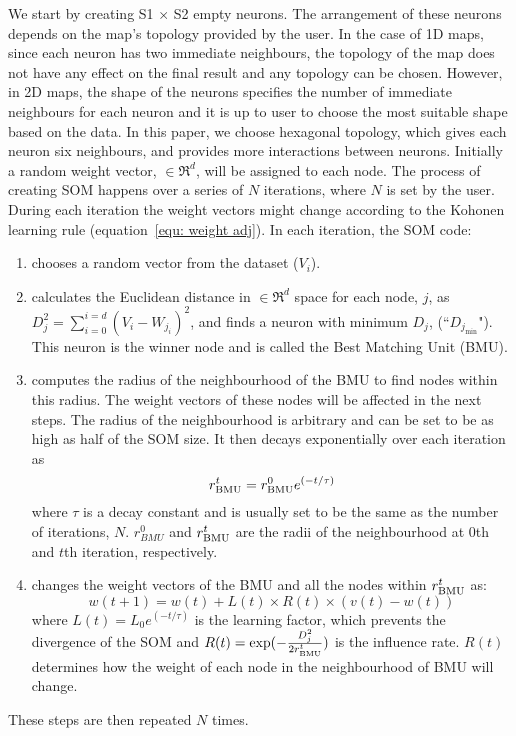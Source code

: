      We start by creating S1 $\times$ S2 empty neurons. 
     The arrangement of these neurons depends on the map's topology provided by the user. 
     In the case of 1D maps, since each neuron has two immediate neighbours, the topology of the map does not have any effect on the final result and any topology can be chosen.
     However, in 2D maps, the shape of the neurons specifies the number of immediate neighbours for each neuron and it is up to user to choose the most suitable shape based on the data.
     In this paper, we choose hexagonal topology, which gives each neuron six neighbours, and provides more interactions between neurons.
     Initially a random weight vector,  $\in \Re^d$, will be assigned to each node.
     The process of creating SOM happens over a series of $N$ iterations, where $N$ is set by the user. 
     During each iteration the weight vectors might change according to the Kohonen learning rule (equation~\ref{equ: weight adj}). 
      In each iteration, the SOM code:
     \begin{enumerate}
        \item chooses a random vector from the dataset ($V_i$).
        \item calculates the Euclidean distance in $\in \Re^d$ space for each node, $j$, as  $D_j^2= \sum_{i=0}^{i=d} (V_i - W_{j_i})^2$, and finds a neuron with minimum $D_j$, (``$D_{j_{\min}}$"). This neuron is the winner node and is called the Best Matching Unit (BMU). 
        \item  computes the radius of the neighbourhood of the BMU to find nodes within this radius. The weight vectors of these nodes will be affected in the next steps. The radius of the neighbourhood is arbitrary and can be set to be as high as half of the SOM size. It then decays exponentially over each iteration as
        \begin{equation}
            r^t_{\rm BMU} = r^0_{\rm BMU}e^{(-t/\tau)}
        \end{equation}
        where $\tau$ is a decay constant and is usually set to be the same as the number of iterations, $N$. $r^0_{BMU}$ and $r^t_{\rm BMU}$ are the radii of the neighbourhood at 0th and $t$th iteration, respectively. 
        \item changes the weight vectors of the BMU and all the nodes within $r^t_{\rm BMU}$ as:
        \begin{equation}
            \label{equ: weight adj}
            w(t+1)=w(t)+L(t) \times R(t) \times(v(t)-w(t))
        \end{equation}
        where $L(t) = L_0 e^{(-t/\tau)}$ is the learning factor, which prevents the divergence of the SOM and $R(t)=\exp(-\frac{D_j^2}{2r^t_{\rm BMU}})$ is the influence rate. $R(t)$ determines how the weight of each node in the neighbourhood of BMU will change.
     \end{enumerate}
     These steps are then repeated $N$ times.
     

